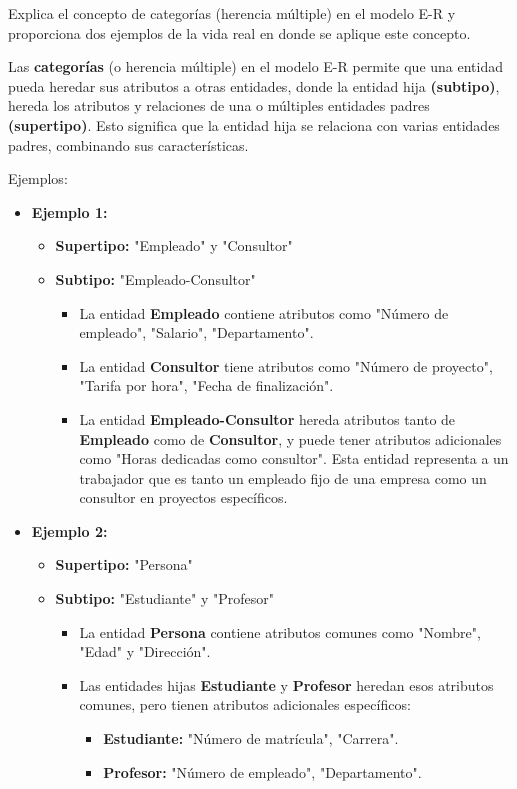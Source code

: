 
Explica el concepto de categorías (herencia múltiple) en el modelo E-R y proporciona dos ejemplos de la vida real en donde se aplique este concepto.

Las \textbf{categorías} (o herencia múltiple) en el modelo E-R permite que una entidad pueda heredar sus atributos a otras entidades, donde la entidad hija \textbf{(subtipo)}, hereda los atributos y relaciones de una o múltiples entidades padres \textbf{(supertipo)}. Esto significa que la entidad hija se relaciona con varias entidades padres, combinando sus características.

Ejemplos:
\begin{itemize}
    \item \textbf{Ejemplo 1:}
    \begin{itemize}
        \item \textbf{Supertipo: } "Empleado" y "Consultor"
        \item \textbf{Subtipo:} "Empleado-Consultor"
        
    \begin{itemize}
        \item La entidad \textbf{Empleado} contiene atributos como "Número de empleado", "Salario", "Departamento".
        \item La entidad \textbf{Consultor} tiene atributos como "Número de proyecto", "Tarifa por hora", "Fecha de finalización".
        \item La entidad \textbf{Empleado-Consultor} hereda atributos tanto de \textbf{Empleado} como de \textbf{Consultor}, y puede tener atributos adicionales como "Horas dedicadas como consultor". Esta entidad representa a un trabajador que es tanto un empleado fijo de una empresa como un consultor en proyectos específicos.
    \end{itemize}
    \end{itemize}

    \item \textbf{Ejemplo 2:}
    \begin{itemize}
         \item \textbf{Supertipo:} "Persona"
        \item \textbf{Subtipo:} "Estudiante" y "Profesor"
        
    \begin{itemize}
        \item La entidad \textbf{Persona} contiene atributos comunes como "Nombre", "Edad" y "Dirección".
        \item Las entidades hijas \textbf{Estudiante} y \textbf{Profesor} heredan esos atributos comunes, pero tienen atributos adicionales específicos:
        \begin{itemize}
            \item \textbf{Estudiante:} "Número de matrícula", "Carrera".
            \item \textbf{Profesor:} "Número de empleado", "Departamento".
        \end{itemize}
    \end{itemize}
    \end{itemize}
\end{itemize}
